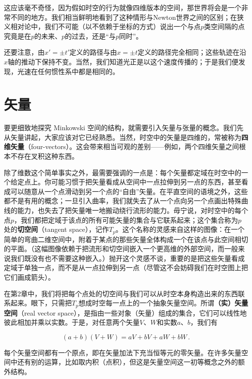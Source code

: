 这应该毫不奇怪，因为假如时空的行为就像四维版本的空间，那世界将会是一个非常不同的地方。我们相当鲜明地看到了这种情形与Newton世界之间的区别；在狭义相对论中，我们不可能（以不依赖于坐标的方式）说出一个与点$p$类空间隔的点究竟是在$p$的未来、$p$的过去，还是“与$p$同时”。

还要注意，由$x'=\pm t'$定义的路径与由$x=\pm t$定义的路径完全相同；这些轨迹在沿$x$轴的推动下保持不变。当然，我们知道光正是以这个速度传播的；于是我们便发现，光速在任何惯性系中都是相同的。

\section{矢量}

要更细致地探究 Minkowski 空间的结构，就需要引入矢量与张量的概念。我们先从矢量讲起，大家应该对它已经熟悉。当然，时空中的矢量是四维的，常被称为\textbf{四维矢量}（four-vectors）。这会带来相当可观的差别——例如，两个四维矢量之间根本不存在叉积这种东西。

除了维数这个简单事实之外，最需要强调的一点是：每个矢量都定域在时空中的一个给定点上。你可能习惯于把矢量看成从空间中一点拉伸到另一点的东西，甚至看成可以随意从一个点滑动到另一个点的“自由”矢量。在平直空间的语境之外，这些都不是有用的概念；一旦引入曲率，我们就失去了从一个点向另一个点画出特殊曲线的能力，也失去了把矢量唯一地搬动绕行流形的能力。毋宁说，对时空中的每个点$p$，我们都把定域于该点的所有可能矢量的集合与它联系起来；这个集合称为$p$处的\textbf{切空间}（tangent space），记作$T_p$。这个名称的灵感来自这样的图像：在一个简单的弯曲二维空间中，附着于某点的那些矢量全体构成一个在该点与此空间相切的平面。（这幅图像依赖于把流形和切空间嵌入一个更高维的外部空间，而一般来说我们既没有也不需要这种嵌入。）抛开这个灵感不谈，重要的是把这些矢量看成定域于单独一点，而不是从一点拉伸到另一点（尽管这不会妨碍我们在时空图上把它们画成箭头）。

在第2章中，我们将把每个点处的切空间与我们可以从时空本身构造出来的东西联系起来。眼下，只需把$T_p$想成时空每一点上的一个抽象矢量空间。所谓\textbf{（实）矢量空间}（real vector space），是指由一些对象（矢量）组成的集合，它们可以线性地彼此相加并乘以实数。于是，对任意两个矢量$V$、$W$和实数$a$、$b$，我们有

\begin{equation*}
(a+b)(V+W)=aV+bV+aW+bW\,.
\tag{1.36}
\end{equation*}

每个矢量空间都有一个原点，即在矢量加法下充当恒等元的零矢量。在许多矢量空间中还有别的运算，比如取内积（点积），但这是矢量空间这一初等概念之外的额外结构。

